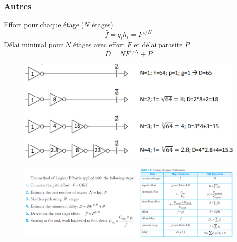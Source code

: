 \documentclass[resume]{subfiles}
\begin{document}
\begin{multicols}{3}
\subsubsection{Autres}
Effort pour chaque étage ($N$ étages)
$$\hat{f}=g_ih_i=F^{1/N}$$
Délai minimal pour $N$ étages avec effort $F$ et délai parasite $P$
$$D=NF^{1/N}+P$$
\begin{figure}[H]
\centering
\includegraphics[width=\columnwidth]{img_50.png}
\end{figure}
\end{multicols}
\begin{figure}[H]
\centering
\includegraphics[width=16.00cm]{img_51.png}
\end{figure}
\end{document}
